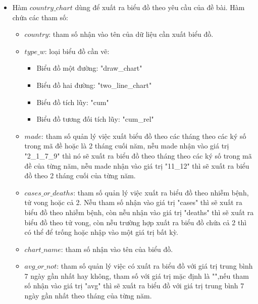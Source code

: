 \documentclass[a4paper]{article}
\theoremstyle{definition}
\begin{document}
\begin{enumerate}[i)]
\begin{itemize}
    \item Hàm $country\_chart$ dùng để xuất ra biểu đồ theo yêu cầu của đề bài. Hàm chứa các tham số:\\
        \begin{itemize}
            \item $country$: tham số nhận vào tên của dữ liệu cần xuất biểu đồ.\\
            \item $type\_w$: loại biểu đồ cần vẽ:\\
                \begin{itemize}
                    \item Biểu đồ một đường: "draw\_chart"\\
                    \item Biểu đồ hai đường: "two\_line\_chart"\\
                    \item Biểu đồ tích lũy: "cum"\\
                    \item Biểu đồ tương đối tích lũy: "cum\_rel"\\
                \end{itemize}
            \item $made$: tham số quản lý việc xuất biểu đồ theo các tháng theo các ký số trong mã đề hoặc là 2 tháng cuối năm, nễu made nhận vào giá trị "2\_1\_7\_9" thì nó sẽ xuất ra biểu đồ theo tháng theo các ký số trong mã đề của từng năm, nễu made nhận vào giá trị "11\_12" thì sẽ xuất ra biểu đồ theo 2 tháng cuối của từng năm.\\
            \item $cases\_or\_deaths$: tham số quản lý việc xuất ra biểu đồ theo nhiễm bệnh, tử vong hoặc cả 2. Nễu tham số nhận vào giá trị "cases" thì sẽ xuất ra biểu đồ theo nhiễm bệnh, còn nễu nhận vào giá trị "deaths" thì sẽ xuất ra biểu đồ theo tử vong, còn nễu trường hợp xuất ra biểu đồ chứa cả 2 thì có thể để trống hoặc nhập vào một giá trị bất kỳ.\\
            \item $chart\_name$: tham số nhận vào tên của biểu đồ.\\ 
            \item $avg\_or\_not$: tham số quản lý việc có xuất ra biểu đồ với giá trị trung bình 7 ngày gần nhất hay không, tham số với giá trị mặc định là "",nếu tham số nhận vào giá trị "avg" thì sẽ xuất ra biểu đồ với giá trị trung bình 7 ngày gần nhất theo tháng của từng năm.
        \end{itemize}

\end{itemize}
\end{enumerate}
\end{document}
